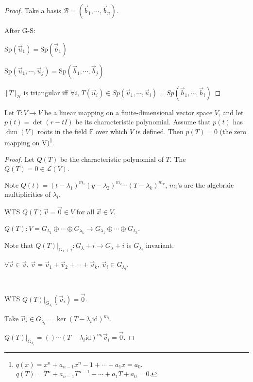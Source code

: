 \documentclass[11pt,fleqn]{book} %
\begin{document}
\begin{proof}
    Take a basis $\mathcal{B} = (\vec{b}_1, \cdots, \vec{b}_n)$.

    After G-S:

    $\mathrm{Sp}(\vec{u}_1) = \mathrm{Sp}(\vec{b}_1)$

    $\mathrm{Sp}(\vec{u}_1, \cdots, \vec{u}_j) = \mathrm{Sp}(\vec{b}_1, \cdots, \vec{b}_j)$

    $[T]_\mathcal{U}$ is triangular iff $\forall i$, $T(\vec{u}_i)\in Sp(\vec{u}_1, \cdots, \vec{u}_i) = Sp(\vec{b}_1, \cdots, \vec{b}_i)$
\end{proof}

\setcounter{chapter}{6}
\setcounter{dummy}{11}
\begin{theorem}
    Let $T: V \to V$ be a linear mapping on a finite-dimensional vector space $V$, and let $p(t) = \det(r - tI)$ be its characteristic polynomial. Assume that $p(t)$ has $\dim(V)$ roots in the field $\mathbb{F}$ over which $V$ is defined. Then $p(T) = 0$ (the zero mapping on V)\footnote{$q(x) = x^n + a_{n-1}x^n-1 + \cdots +a_1x = a_0$. $q(T) = T^n + a_{n-1}T^{n-1}+\cdots+a_1T + a_0 = 0$. }.
\end{theorem}
\setcounter{chapter}{4}

\begin{proof}
    Let $Q(T)$ be the characteristic polynomial of $T$. The $Q(T) = 0 \in \mathcal{L}(V)$. 
    
    Note $Q(t) = (t - \lambda_1)^{m_1}(y-\lambda_2)^{m_2}\cdots(T-\lambda_k)^{m_k}$, $m_i$'s are the algebraic multiplicities of $\lambda_i$. 
    
    WTS $Q(T) \vec{v} = \vec{0} \in V$ for all $\vec{x} \in V$. 
    
    $Q(T): V = G_{\lambda_1}\oplus\cdots\oplus G_{\lambda_k} \to G_{\lambda_1}\oplus\cdots\oplus G_{\lambda_k}$.
    
    Note that $Q(T)\big|_{G_\lambda+i}: {G_\lambda+i} \to {G_\lambda+i}$ is $G_{\lambda_i}$ invariant. 
    
    $\forall \vec{v} \in \vec{v}$, $\vec{v} = \vec{v}_1 + \vec{v}_2 + \cdots + \vec{v}_k$, $\vec{v}_i \in G_{\lambda_i}$. 
    
    {~~~}
    
    WTS $Q(T)\big|_{G_{\lambda_i}}(\vec{v}_i) = \vec{0}$. 
    
    Take $\vec{v}_i \in G_{\lambda_i} = \ker (T - \lambda_i\mathrm{id})^{m_i}$. 
    
    $Q(T)\big|_{G_{\lambda_i}} = ()\cdots(T-\lambda_i\mathrm{id})^{m_i} \vec{v}_i = \vec{0}$. 
\end{proof}
\end{document}
